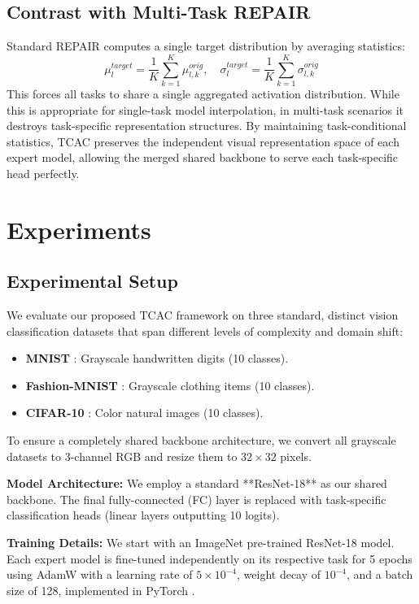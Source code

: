 \documentclass{article}
\theoremstyle{plain}
\theoremstyle{definition}
\theoremstyle{remark}
\begin{document}
\subsection{Contrast with Multi-Task REPAIR}
Standard REPAIR \cite{jordan2022repair} computes a single target distribution by averaging statistics:
\begin{equation}
\mu_{l}^{target} = \frac{1}{K} \sum_{k=1}^K \mu_{l, k}^{orig}, \quad \sigma_{l}^{target} = \frac{1}{K} \sum_{k=1}^K \sigma_{l, k}^{orig}
\end{equation}
This forces all tasks to share a single aggregated activation distribution. While this is appropriate for single-task model interpolation, in multi-task scenarios it destroys task-specific representation structures. By maintaining task-conditional statistics, TCAC preserves the independent visual representation space of each expert model, allowing the merged shared backbone to serve each task-specific head perfectly.

\section{Experiments}
\label{sec:experiments}

\subsection{Experimental Setup}
We evaluate our proposed TCAC framework on three standard, distinct vision classification datasets that span different levels of complexity and domain shift:
\begin{itemize}
    \item \textbf{MNIST} \cite{lecun1998gradient}: Grayscale handwritten digits (10 classes).
    \item \textbf{Fashion-MNIST} \cite{xiao2017fashion}: Grayscale clothing items (10 classes).
    \item \textbf{CIFAR-10} \cite{krizhevsky2009learning}: Color natural images (10 classes).
\end{itemize}
To ensure a completely shared backbone architecture, we convert all grayscale datasets to 3-channel RGB and resize them to $32 \times 32$ pixels.

\textbf{Model Architecture:} We employ a standard **ResNet-18** \cite{he2016deep} as our shared backbone. The final fully-connected (FC) layer is replaced with task-specific classification heads (linear layers outputting 10 logits). 

\textbf{Training Details:} We start with an ImageNet \cite{deng2009imagenet} pre-trained ResNet-18 model. Each expert model is fine-tuned independently on its respective task for 5 epochs using AdamW \cite{loshchilov2017decoupled} with a learning rate of $5 \times 10^{-4}$, weight decay of $10^{-4}$, and a batch size of 128, implemented in PyTorch \cite{paszke2019pytorch}.
\end{document}
